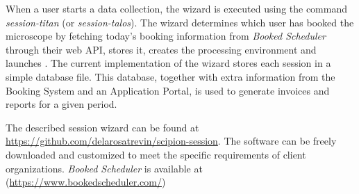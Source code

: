 
When a user starts a data collection, the wizard is executed using the command \textit{session-titan} (or \textit{session-talos}). The wizard determines which user has booked the microscope by fetching today's booking information from \emph{Booked Scheduler} through their web API, %
stores it, creates the processing environment and launches \scipion. %
The current implementation of the wizard stores each session in a simple database file. This database, together with extra information from the Booking System and an Application Portal, is used to generate invoices and reports for a given period. %

The described session wizard can be found at  
\url{https://github.com/delarosatrevin/scipion-session}. The software can be freely downloaded and customized to meet the specific requirements of client organizations. \emph{Booked Scheduler} is available at (\url{https://www.bookedscheduler.com/})



